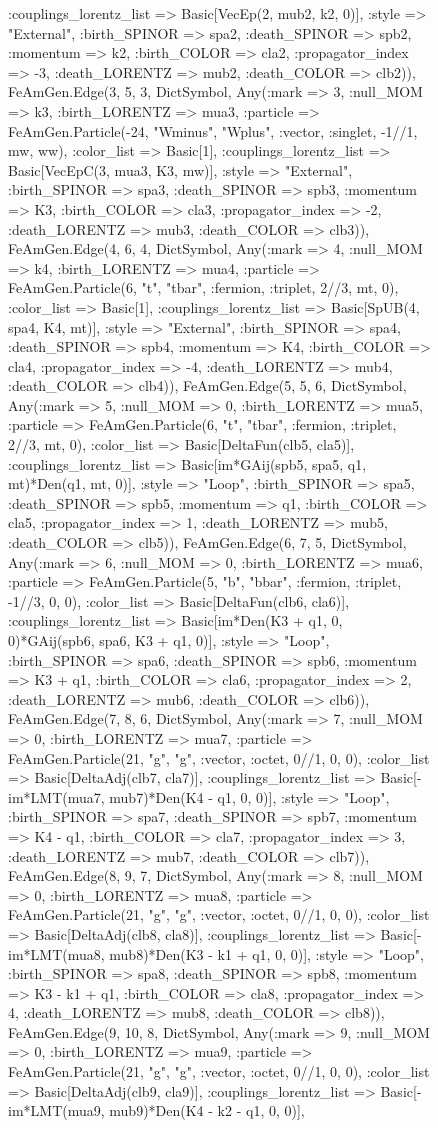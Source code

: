 \documentclass{revtex4}
\begin{document}
\begin{figure}[!htb]
\begin{center}
{:couplings_lorentz_list => Basic[VecEp(2, mub2, k2, 0)], :style => "External", :birth_SPINOR => spa2, :death_SPINOR => spb2, :momentum => k2, :birth_COLOR => cla2, :propagator_index => -3, :death_LORENTZ => mub2, :death_COLOR => clb2)), FeAmGen.Edge(3, 5, 3, Dict{Symbol, Any}(:mark => 3, :null_MOM => k3, :birth_LORENTZ => mua3, :particle => FeAmGen.Particle(-24, "Wminus", "Wplus", :vector, :singlet, -1//1, mw, ww), :color_list => Basic[1], :couplings_lorentz_list => Basic[VecEpC(3, mua3, K3, mw)], :style => "External", :birth_SPINOR => spa3, :death_SPINOR => spb3, :momentum => K3, :birth_COLOR => cla3, :propagator_index => -2, :death_LORENTZ => mub3, :death_COLOR => clb3)), FeAmGen.Edge(4, 6, 4, Dict{Symbol, Any}(:mark => 4, :null_MOM => k4, :birth_LORENTZ => mua4, :particle => FeAmGen.Particle(6, "t", "tbar", :fermion, :triplet, 2//3, mt, 0), :color_list => Basic[1], :couplings_lorentz_list => Basic[SpUB(4, spa4, K4, mt)], :style => "External", :birth_SPINOR => spa4, :death_SPINOR => spb4, :momentum => K4, :birth_COLOR => cla4, :propagator_index => -4, :death_LORENTZ => mub4, :death_COLOR => clb4)), FeAmGen.Edge(5, 5, 6, Dict{Symbol, Any}(:mark => 5, :null_MOM => 0, :birth_LORENTZ => mua5, :particle => FeAmGen.Particle(6, "t", "tbar", :fermion, :triplet, 2//3, mt, 0), :color_list => Basic[DeltaFun(clb5, cla5)], :couplings_lorentz_list => Basic[im*GAij(spb5, spa5, q1, mt)*Den(q1, mt, 0)], :style => "Loop", :birth_SPINOR => spa5, :death_SPINOR => spb5, :momentum => q1, :birth_COLOR => cla5, :propagator_index => 1, :death_LORENTZ => mub5, :death_COLOR => clb5)), FeAmGen.Edge(6, 7, 5, Dict{Symbol, Any}(:mark => 6, :null_MOM => 0, :birth_LORENTZ => mua6, :particle => FeAmGen.Particle(5, "b", "bbar", :fermion, :triplet, -1//3, 0, 0), :color_list => Basic[DeltaFun(clb6, cla6)], :couplings_lorentz_list => Basic[im*Den(K3 + q1, 0, 0)*GAij(spb6, spa6, K3 + q1, 0)], :style => "Loop", :birth_SPINOR => spa6, :death_SPINOR => spb6, :momentum => K3 + q1, :birth_COLOR => cla6, :propagator_index => 2, :death_LORENTZ => mub6, :death_COLOR => clb6)), FeAmGen.Edge(7, 8, 6, Dict{Symbol, Any}(:mark => 7, :null_MOM => 0, :birth_LORENTZ => mua7, :particle => FeAmGen.Particle(21, "g", "g", :vector, :octet, 0//1, 0, 0), :color_list => Basic[DeltaAdj(clb7, cla7)], :couplings_lorentz_list => Basic[-im*LMT(mua7, mub7)*Den(K4 - q1, 0, 0)], :style => "Loop", :birth_SPINOR => spa7, :death_SPINOR => spb7, :momentum => K4 - q1, :birth_COLOR => cla7, :propagator_index => 3, :death_LORENTZ => mub7, :death_COLOR => clb7)), FeAmGen.Edge(8, 9, 7, Dict{Symbol, Any}(:mark => 8, :null_MOM => 0, :birth_LORENTZ => mua8, :particle => FeAmGen.Particle(21, "g", "g", :vector, :octet, 0//1, 0, 0), :color_list => Basic[DeltaAdj(clb8, cla8)], :couplings_lorentz_list => Basic[-im*LMT(mua8, mub8)*Den(K3 - k1 + q1, 0, 0)], :style => "Loop", :birth_SPINOR => spa8, :death_SPINOR => spb8, :momentum => K3 - k1 + q1, :birth_COLOR => cla8, :propagator_index => 4, :death_LORENTZ => mub8, :death_COLOR => clb8)), FeAmGen.Edge(9, 10, 8, Dict{Symbol, Any}(:mark => 9, :null_MOM => 0, :birth_LORENTZ => mua9, :particle => FeAmGen.Particle(21, "g", "g", :vector, :octet, 0//1, 0, 0), :color_list => Basic[DeltaAdj(clb9, cla9)], :couplings_lorentz_list => Basic[-im*LMT(mua9, mub9)*Den(K4 - k2 - q1, 0, 0)], }
\end{center}
\end{figure}
\end{document}
